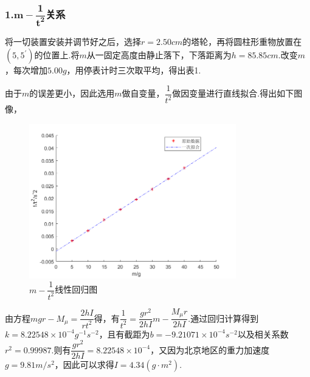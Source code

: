 \documentclass[12pt,a4paper,UTF8]{ctexart}
\begin{document}
\subsubsection*{1.$\mathbf{m-\dfrac{1}{t^2}}$关系}
将一切装置安装并调节好之后，选择$r=2.50cm$的塔轮，再将圆柱形重物放置在$(5,5^{\prime})$的位置上.将$m$从一固定高度由静止落下，下落距离为$h=85.85cm$.改变$m$，每次增加$5.00g$，用停表计时三次取平均，得出表1.
\begin{table}[htbp]
\centering
\caption{实验一数据表}
\end{table}
\par
由于$m$的误差更小，因此选用$m$做自变量，$\dfrac{1}{t^2}$做因变量进行直线拟合.得出如下图像，
\newpage
\begin{figure}[htbp]
		\centering
		\includegraphics[width=9cm]{1.png}
		\caption{$m-\dfrac{1}{t^2}$线性回归图}
\end{figure}
\par
由方程$mgr-M_{\mu}=\dfrac{2hI}{rt^2}$得，有$\dfrac{1}{t^2}=\dfrac{gr^2}{2hI}m-\dfrac{M_{\mu}r}{2hI}$.通过回归计算得到$k=8.22548\times10^{-4}g^{-1}s^{-2}$，且有截距为$b=-9.21071\times10^{-4}s^{-2}$以及相关系数$r^2=0.99987$.则有$\dfrac{gr^2}{2hI}=8.22548\times10^{-4}$，又因为北京地区的重力加速度$g=9.81m/s^2$，因此可以求得$I=4.34(g\cdot m^2)$.\par
\end{document}
